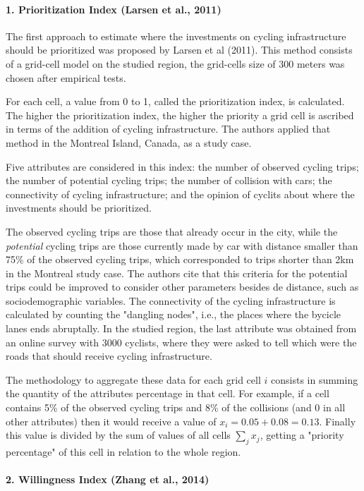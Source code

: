 \documentclass[a4paper]{article}
\begin{document}
\paragraph{1. Prioritization Index (Larsen et al., 2011) }
The first approach to estimate where the investments on cycling infrastructure should be prioritized was proposed by Larsen et al (2011). This method consists of a grid-cell model on the studied region, the grid-cells size of 300 meters was chosen after empirical tests.

For each cell, a value from 0 to 1, called the prioritization index, is calculated.  The higher the prioritization index, the higher the priority a grid cell is ascribed in terms of the addition of cycling infrastructure. The authors applied that method in the Montreal Island, Canada, as a study case. 

Five attributes are considered in this index: the number of observed cycling trips; the number of potential cycling trips; the number of collision with cars; the connectivity of cycling infrastructure; and the opinion of cyclits about where the investments should be prioritized.

The observed cycling trips are those that already occur in the city, while the \textit{potential} cycling trips are those currently made by car with distance smaller than 75\% of the observed cycling trips, which corresponded to trips shorter than 2km in the Montreal study case. The authors cite that this criteria for the potential trips could be improved to consider other parameters besides de distance, such as sociodemographic variables. The connectivity of the cycling infrastructure is calculated by counting the "dangling nodes", i.e., the places where the bycicle lanes ends abruptally.
In the studied region, the last attribute was obtained from an online survey with 3000 cyclists, where they were asked to tell which were the roads that should receive cycling infrastructure.

The methodology to aggregate these data for each grid cell $i$ consists in summing the quantity of the attributes percentage in that cell. For example, if a cell contains 5\% of the observed cycling trips and 8\% of the collisions (and 0 in all other attributes) then it would receive a value of $x_i = 0.05 + 0.08 = 0.13$. Finally this value is divided by the sum of values of all cells $\sum_{j}{x_j}$, getting a "priority percentage" of this cell in relation to the whole region.

\paragraph{2. Willingness Index (Zhang et al., 2014) }
\end{document}
